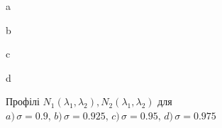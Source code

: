 \begin{figure}[h]
\begin{minipage}[h]{0.49\linewidth}
 a
\end{minipage}
\hfill
\begin{minipage}[h]{0.49\linewidth}
 b
\end{minipage}
\vfill
\begin{minipage}[h]{0.49\linewidth}
 c
\end{minipage}
\hfill
\begin{minipage}[h]{0.49\linewidth}
 d
\end{minipage}
\caption{Профілі $N_1(\lambda_1,\lambda_2),N_2(\lambda_1,\lambda_2)$ для $a)\, \sigma = 0.9,\, b)\, \sigma = 0.925, \, c)\, \sigma = 0.95,\, d)\, \sigma = 0.975$ }
\end{figure}

